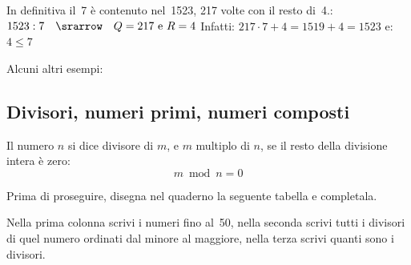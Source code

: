 In definitiva il~7 è contenuto nel~1523, 217 volte con il resto di~4.:\\
\(1523:7 \quad \srarrow \quad Q=217 \text{ e } R=4\) \quad
Infatti: \(217 \cdot 7 + 4 = 1519 + 4 = 1523\)
e: \(4 \leqslant 7\)

\vspace{.5em}
Alcuni altri esempi:

\vspace{-6pt}
\begin{center}
\begin{inaccessibleblock}
 
\end{inaccessibleblock}
\end{center}
\vspace{-12pt}


\subsection{Divisori, numeri primi, numeri composti}


\begin{definizione}
Il numero \(n\) si dice divisore di \(m\), e \(m\) multiplo di \(n\),
se il resto della divisione intera è zero: 
\[m \bmod n = 0\]
\end{definizione}

Prima di proseguire, disegna nel quaderno la seguente tabella e completala. 
 
Nella prima colonna scrivi i numeri fino al~50, nella seconda scrivi tutti 
i divisori di quel numero ordinati dal minore al maggiore, nella terza 
scrivi quanti sono i divisori.

